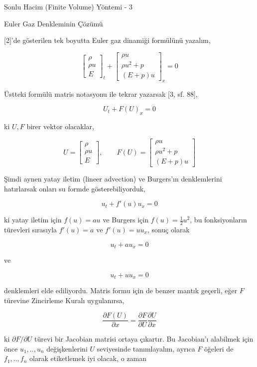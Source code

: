 \documentclass[12pt,fleqn]{article}\usepackage{../../common}
\begin{document}
Sonlu Hacim (Finite Volume) Yöntemi - 3

Euler Gaz Denkleminin Çözümü

[2]'de gösterilen tek boyutta Euler gaz dinamiği formülünü yazalım,

$$
\left[\begin{array}{c}
\rho \\ \rho u  \\ E
\end{array}\right]_t
+
\left[\begin{array}{c}
\rho u \\ \rho u^2 + p \\ (E+p) u 
\end{array}\right]_x 
= 0
$$

Üstteki formülü matris notasyonu ile tekrar yazarsak [3, sf. 88],

$$
U_t + F(U)_x = 0
$$

ki $U,F$ birer vektor olacaklar,

$$
U = \left[\begin{array}{c}
\rho \\ \rho u  \\ E
\end{array}\right], \qquad
F(U) =
\left[\begin{array}{c}
\rho u \\ \rho u^2 + p \\ (E+p) u 
\end{array}\right]
$$

Şimdi aynen yatay iletim (lineer advection) ve Burgers'ın denklemlerini
hatırlarsak onları su formde gösterebiliyorduk,

$$
u_t + f'(u) u_x = 0
$$

ki yatay iletim için $f(u) = au$ ve Burgers için $f(u) = \frac{1}{2} u^2$,
bu fonksiyonların türevleri sırasıyla $f'(u) = a$ ve $f'(u) = u u_x$,
sonuç olarak

$$
u_t + a u_x = 0
$$

ve

$$
u_t + u u_x = 0
$$

denklemleri elde ediliyordu. Matris formu için de benzer mantık geçerli,
eğer $F$ türevine Zincirleme Kuralı uygulanırsa,

$$
\frac{\partial F(U)}{\partial x} =
\frac{\partial F}{\partial U} \frac{\partial U}{\partial x}
$$

ki $\partial F / \partial U$ türevi bir Jacobian matrisi ortaya çıkartır. Bu
Jacobian'ı alabilmek için önce $u_1,..,u_n$ değişkenlerini $U$ seviyesinde
tanımlayalım, ayrıca $F$ öğeleri de $f_1,..,f_n$ olarak etiketlemek iyi
olacak, o zaman 
\end{document}
